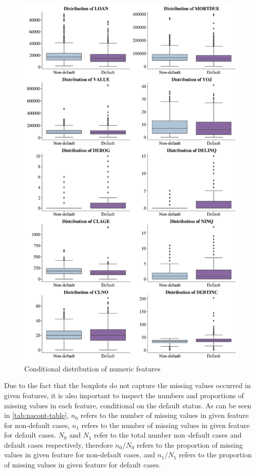 \begin{figure}[H]
\centering
\caption{Conditional distribution of numeric features}\vspace{0.5em}
\label{fig:boxfeat}
\includegraphics[width=140mm]{Figures/Numeric_Features_Distribution_Boxplots.jpg}
\vspace{-1em}
\end{figure}

Due to the fact that the boxplots do not capture the missing values occurred in given features, it is also important to inspect the numbers and proportions of missing values in each feature, conditional on the default status.
As can be seen in \autoref{tab:nacont-table}, $n_0$ refers to the number of missing values in given feature for non-default cases, $n_1$ refers to the number of missing values in given feature for default cases.
$N_0$ and $N_1$ refer to the total number non--default cases and default cases respectively, therefore $n_0/N_0$ refers to the proportion of missing values in given feature for non-default cases, and $n_1/N_1$ refers to the proportion of missing values in given feature for default cases.

